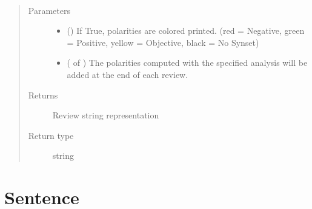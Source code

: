 \documentclass[letterpaper,10pt,english]{sphinxmanual}
\begin{document}
\begin{fulllineitems}
\begin{quote}
\begin{description}
\end{description}\end{quote}

\begin{fulllineitems}
\label{\detokenize{classes:loacore.classes.classes.Review.review_str}}~\begin{quote}\begin{description}
\item[{Parameters}] \leavevmode\begin{itemize}
\item {} 
 () \textendash{} If True, polarities are colored printed.
(red = Negative, green = Positive, yellow = Objective, black = No Synset)

\item {} 
 ( of ) \textendash{} The polarities computed with the specified analysis will be added at the end of each review.

\end{itemize}

\item[{Returns}] \leavevmode
Review string representation

\item[{Return type}] \leavevmode
string

\end{description}\end{quote}

\end{fulllineitems}


\end{fulllineitems}



\section{Sentence}
\label{\detokenize{classes:sentence}}
\end{document}

